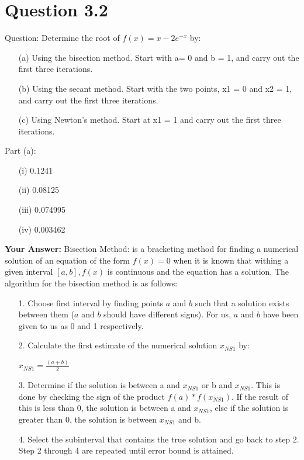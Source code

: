 \documentclass[12pt,a4paper]{report}
\begin{document}
\section{Question 3.2}
Question: Determine the root of $f(x) = x - 2e^{-x}$ by: 
\begin{itemize}
\item[(a)] Using the bisection method. Start with a= 0 and  b = 1, and carry out the first three iterations.
\item[(b)] Using the secant method. Start with the two points, x1 = 0 and x2 = 1, and carry out the first three iter­ations. 
\item[(c)] Using Newton's method. Start at x1 = 1 and carry out the first three iterations. 
\end{itemize}
Part (a):
\begin{itemize}
\item[(i)] 0.1241
\item[(ii)] 0.08125
\item[(iii)] 0.074995
\item[(iv)] 0.003462
\end{itemize}
\textbf{Your Answer:}
\newline
Bisection Method: is a bracketing method for finding a numerical solution of an equation of the form $f(x) = 0$ when it is known that withing a given interval $[a,b], f(x)$ is continuous and the equation has a solution.
\newline
The algorithm for the bisection method is as follows:
\begin{itemize}
\item[1.] Choose first interval by finding points $a$ and $b$ such that a solution exists between them ($a$ and $b$ should have different signs). For us, $a$ and $b$ have been given to us as 0 and 1 respectively.
\item[2.] Calculate the first estimate of the numerical solution $x_{NS1}$ by:
\begin{center}
$x_{NS1} = \frac{(a+b)}{2}$
\end{center}
\item[3.] Determine if the solution is between a and $x_{NS1}$ or b and $x_{NS1}$. This is done by checking the sign of the product $f(a) * f(x_{NS1})$. If the result of this is less than 0, the solution is between a and $x_{NS1}$, else if the solution is greater than 0, the solution is between $x_{NS1}$ and b.
\item[4.] Select the subinterval that contains the true solution and go back to step 2. Step 2 through 4 are repeated until error bound is attained.
\end{itemize}
\end{document}
